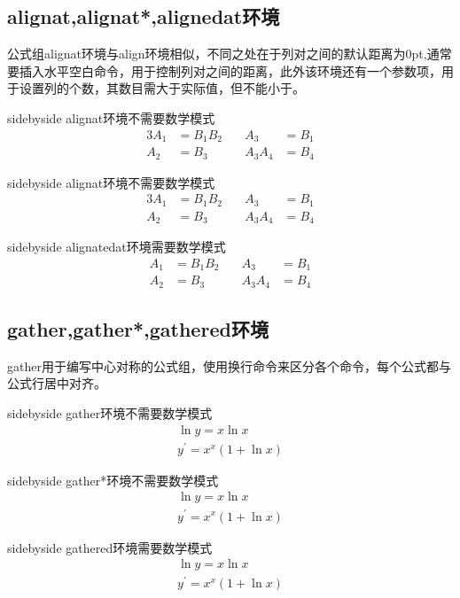 \documentclass[cn,chinese,color=cyan]{elegantbook}
\begin{document}
\subsection{alignat,alignat*,alignedat环境}
公式组alignat环境与align环境相似，不同之处在于列对之间的默认距离为0pt,通常要插入水平空白命令，用于控制列对之间的距离，此外该环境还有一个参数项，用于设置列的个数，其数目需大于实际值，但不能小于。
\begin{tcblisting}{sidebyside}
alignat环境不需要数学模式
\begin{alignat}{3}
A_{1}&=B_{1} B_{2} \quad &A_{3}&=B_{1} \\ 
A_{2}&=B_{3} & A_{3} A_{4}&=B_{4}
\end{alignat}
\end{tcblisting}
\begin{tcblisting}{sidebyside}
alignat环境不需要数学模式
\begin{alignat*}{3}
A_{1}&=B_{1} B_{2} \quad &A_{3}&=B_{1} \\ 
A_{2}&=B_{3} & A_{3} A_{4}&=B_{4}
\end{alignat*}
\end{tcblisting}
\begin{tcblisting}{sidebyside}
alignatedat环境需要数学模式
$$\begin{alignedat}{3}
A_{1}&=B_{1} B_{2} \quad &A_{3}&=B_{1} \\ 
A_{2}&=B_{3} & A_{3} A_{4}&=B_{4}
\end{alignedat}$$
\end{tcblisting}
\subsection{gather,gather*,gathered环境}
gather用于编写中心对称的公式组，使用换行命令来区分各个命令，每个公式都与公式行居中对齐。

\begin{tcblisting}{sidebyside}
gather环境不需要数学模式
\begin{gather}
\ln y=x \ln x \\
y^{\prime}=x^{x}(1+\ln x)
\end{gather}
\end{tcblisting}
\begin{tcblisting}{sidebyside}
gather*环境不需要数学模式
\begin{gather*}
\ln y=x \ln x \\
y^{\prime}=x^{x}(1+\ln x)
\end{gather*}
\end{tcblisting}
\begin{tcblisting}{sidebyside}
gathered环境需要数学模式
$$\begin{gathered}
\ln y=x \ln x \\
y^{\prime}=x^{x}(1+\ln x)
\end{gathered}$$
\end{tcblisting}
\end{document}
